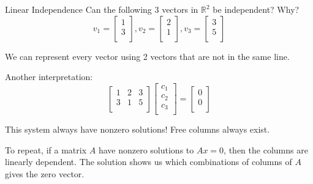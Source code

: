 \documentclass{beamer}
\begin{document}
\begin{frame}{Linear Independence}
Can the following 3 vectors in $\mathbb{R}^2$ be independent? Why?
\begin{equation*}
    v_1=\left[ \begin{array}{c}
        1\\
        3\\
    \end{array} \right] , v_2=\left[ \begin{array}{c}
        2\\
        1\\
    \end{array} \right] , v_3=\left[ \begin{array}{c}
        3\\
        5\\
    \end{array} \right]
\end{equation*}

We can represent every vector using 2 vectors that are not in the same line.

\vspace{3pt}
Another interpretation:
\begin{equation*}
    \left[ \begin{matrix}
        1&		2&		3\\
        3&		1&		5\\
    \end{matrix} \right] \left[ \begin{array}{c}
        c_1\\
        c_2\\
        c_3\\
    \end{array} \right] =\left[ \begin{array}{c}
        0\\
        0\\
    \end{array} \right]
\end{equation*}

This system always have nonzero solutions! Free columns always exist.

\vspace{3pt}
To repeat, if a matrix $A$ have nonzero solutions to $Ax=0$, then the columns are linearly dependent. The solution shows us which combinations of columns of $A$ gives the zero vector.
\end{frame}
\end{document}
